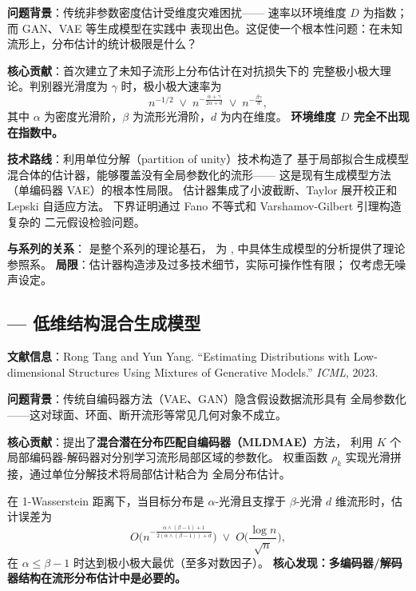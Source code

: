\documentclass[12pt]{amsbook}
\theoremstyle{plain}
\begin{document}
\textbf{问题背景}：传统非参数密度估计受维度灾难困扰——
速率以环境维度 $D$ 为指数；而 GAN、VAE 等生成模型在实践中
表现出色。这促使一个根本性问题：在未知流形上，分布估计的统计极限是什么？

\textbf{核心贡献}：首次建立了未知子流形上分布估计在对抗损失下的
完整极小极大理论。判别器光滑度为 $\gamma$ 时，极小极大速率为
\[
n^{-1/2} \;\vee\;
n^{-\frac{\alpha+\gamma}{2\alpha+d}} \;\vee\;
n^{-\frac{\beta\gamma}{d}},
\]
其中 $\alpha$ 为密度光滑阶，$\beta$ 为流形光滑阶，$d$ 为内在维度。
\textbf{环境维度 $D$ 完全不出现在指数中。}

\textbf{技术路线}：利用单位分解（partition of unity）技术构造了
基于局部拟合生成模型混合体的估计器，能够覆盖没有全局参数化的流形——
这是现有生成模型方法（单编码器 VAE）的根本性局限。
估计器集成了小波截断、Taylor 展开校正和 Lepski 自适应方法。
下界证明通过 Fano 不等式和 Varshamov-Gilbert 引理构造复杂的
二元假设检验问题。

\textbf{与系列的关系}：\citep{tang2022minimax} 是整个系列的理论基石，
为 \citep{tang2023lowdim}, \citep{tang2024diffusion} 中具体生成模型的分析提供了理论参照系。
\textbf{局限}：估计器构造涉及过多技术细节，实际可操作性有限；
仅考虑无噪声设定。

\subsection{\citep{tang2023lowdim} --- 低维结构混合生成模型}
\label{sec:tang-icml2023}

\textbf{文献信息}：Rong Tang and Yun Yang.
``Estimating Distributions with Low-dimensional Structures Using Mixtures
of Generative Models.'' \textit{ICML}, 2023.

\textbf{问题背景}：传统自编码器方法（VAE、GAN）隐含假设数据流形具有
全局参数化——这对球面、环面、断开流形等常见几何对象不成立。

\textbf{核心贡献}：提出了\textbf{混合潜在分布匹配自编码器（MLDMAE）}方法，
利用 $K$ 个局部编码器-解码器对分别学习流形局部区域的参数化。
权重函数 $\rho_k$ 实现光滑拼接，通过单位分解技术将局部估计粘合为
全局分布估计。

在 1-Wasserstein 距离下，当目标分布是 $\alpha$-光滑且支撑于
$\beta$-光滑 $d$ 维流形时，估计误差为
\[
O\!\Big(n^{-\frac{\alpha\wedge(\beta-1)+1}{2(\alpha\wedge(\beta-1))+d}}\Big)
\;\vee\;
O\!\Big(\frac{\log n}{\sqrt{n}}\Big),
\]
在 $\alpha \le \beta-1$ 时达到极小极大最优（至多对数因子）。
\textbf{核心发现：多编码器/解码器结构在流形分布估计中是必要的。}
\end{document}
